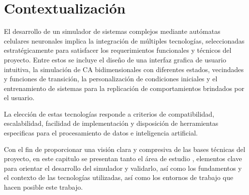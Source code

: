\chapter{Contextualización}

El desarrollo de un simulador de sistemas complejos mediante autómatas celulares neuronales implica la integración de múltiples tecnologías, seleccionadas estratégicamente para satisfacer los requerimientos funcionales y técnicos del proyecto. Entre estos se incluye el diseño de una interfaz grafica de usuario intuitiva, la simulación de CA bidimensionales con diferentes estados, vecindades y funciones de transición, la personalización de condiciones iniciales y el entrenamiento de sistemas para la replicación de comportamientos brindados por el usuario.

La elección de estas tecnologías responde a criterios de compatibilidad, escalabilidad, facilidad de implementación y disposición de herramientas especificas para el procesamiento de datos e inteligencia artificial. 

Con el fin de proporcionar una visión clara y compresiva de las bases técnicas del proyecto, en este capitulo se presentan tanto el área de estudio , elementos clave para orientar el desarrollo del simulador y validarlo, así como los fundamentos y el contexto de las tecnologías utilizadas, así como los entornos de trabajo que hacen posible este trabajo. 



